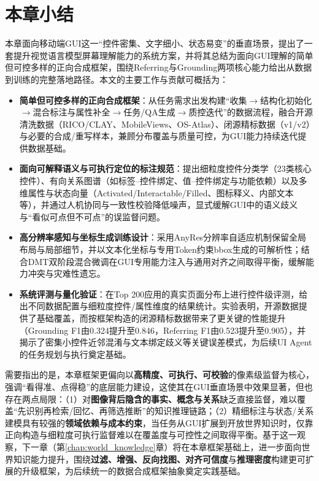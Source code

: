 \section{本章小结}
本章面向移动端GUI这一“控件密集、文字细小、状态易变”的垂直场景，提出了一套提升视觉语言模型屏幕理解能力的系统方案，并将其总结为面向GUI理解的简单但可控多样的正向合成框架，围绕Referring与Grounding两项核心能力给出从数据到训练的完整落地路径。本文的主要工作与贡献可概括为：
\begin{itemize}
  \item \textbf{简单但可控多样的正向合成框架}：从任务需求出发构建“收集$\rightarrow$结构化初始化$\rightarrow$混合标注与属性补全$\rightarrow$任务/QA生成$\rightarrow$质控迭代”的数据流程，融合开源清洗数据（RICO/CLAY、MobileViews、OS-Atlas）\citep{deka2017rico,li2022clay,gao2024mobileviews,wu2024osatlas}、闭源精标数据（v1/v2）与必要的合成/重写样本，兼顾分布覆盖与质量可控，为GUI能力持续迭代提供数据基础。
  \item \textbf{面向可解释语义与可执行定位的标注规范}：提出细粒度控件分类学（23类核心控件）、有向关系图谱（如标签--控件绑定、值--控件绑定与功能依赖）以及多维属性与状态向量（Activated/Interactable/Filled、图标释义、内部文本等），并通过人机协同与一致性校验降低噪声，显式缓解GUI中的语义歧义与“看似可点但不可点”的误监督问题。
  \item \textbf{高分辨率感知与坐标生成训练设计}：采用AnyRes分辨率自适应机制保留全局布局与局部细节，并以文本化坐标与专用Token约束bbox生成的可解析性；结合DMT双阶段混合微调在GUI专用能力注入与通用对齐之间取得平衡，缓解能力冲突与灾难性遗忘。
  \item \textbf{系统评测与量化验证}：在Top 200应用的真实页面分布上进行控件级评测，给出不同数据配置与细粒度控件/属性维度的结果统计。实验表明，开源数据提供了基础覆盖，而按框架构造的闭源精标数据带来了更关键的性能提升（Grounding F1由0.324提升至0.846，Referring F1由0.523提升至0.905），并揭示了密集小控件近邻混淆与文本绑定歧义等关键误差模式，为后续UI Agent的任务规划与执行奠定基础。
\end{itemize}

需要指出的是，本章框架更偏向以\textbf{高精度、可执行、可校验}的像素级监督为核心，强调“看得准、点得稳”的底层能力建设，这使其在GUI垂直场景中效果显著，但也存在两点局限：（1）对\textbf{图像背后隐含的事实、概念与关系}缺乏直接监督，难以覆盖“先识别再检索/回忆、再筛选推断”的知识推理链路；（2）精细标注与状态/关系建模具有较强的\textbf{领域依赖与成本约束}，当任务从GUI扩展到开放世界知识时，仅靠正向构造与细粒度可执行监督难以在覆盖度与可控性之间取得平衡。基于这一观察，下一章（第\ref{chap:world_knowledge}章）将在本章框架基础上，进一步面向世界知识能力提升，围绕\textbf{过滤、增强、反向找图、对齐可信度}与\textbf{推理密度}构建更可扩展的升级框架，为后续统一的数据合成框架抽象奠定实践基础。
